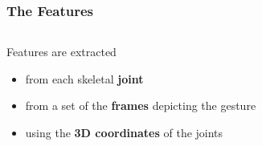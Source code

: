 \begin{frame}
\frametitle{The Features}

\begin{columns}[T]

\begin{column}{.4\linewidth}
Features are extracted
\begin{itemize}
\item from each skeletal \textbf{joint}
\item from a set of the \textbf{frames} depicting the gesture
\item using the \textbf{3D coordinates} of the joints
\end{itemize}

\end{column}

\pause

\begin{column}{.7\linewidth}
\resizebox{\linewidth}{!}{

}
\end{column}
\end{columns}
\end{frame}
